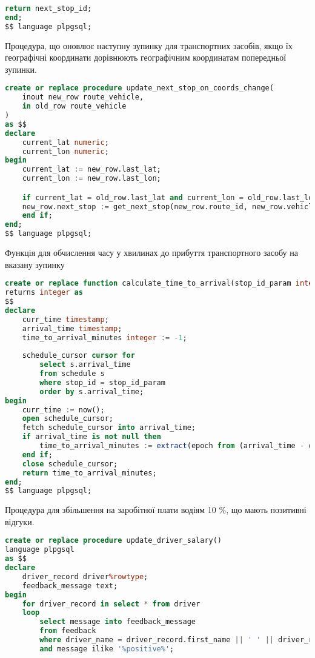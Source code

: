 \documentclass[14pt]{extreport}
\begin{document}
\begin{normalsize}
\begin{small}
\begin{lstlisting}[language=sql]
	return next_stop_id;
end;
$$ language plpgsql;
		\end{lstlisting}
	\end{small}
	
	Процедура, що оновлює наступну зупинку для транспортних засобів, якщо їх географічні координати дорівнюють географічним координатам попередньої зупинки.
	\begin{small}
		\begin{lstlisting}[language=sql]
create or replace procedure update_next_stop_on_coords_change(
	inout new_row route_vehicle,
	in old_row route_vehicle
)
as $$
declare
	current_lat numeric;
	current_lon numeric;
begin
	current_lat := new_row.last_lat;
	current_lon := new_row.last_lon;

	if current_lat = old_row.last_lat and current_lon = old_row.last_lon then
	new_row.next_stop := get_next_stop(new_row.route_id, new_row.vehicle_id);
	end if;
end;
$$ language plpgsql;
		\end{lstlisting}
	\end{small}
	
	Функція для обчислення часу у хвилинах до прибуття транспортного засобу на вказану зупинку
	\begin{small}
		\begin{lstlisting}[language=sql]
create or replace function calculate_time_to_arrival(stop_id_param integer)
returns integer as
$$
declare
	curr_time timestamp;
	arrival_time timestamp;
	time_to_arrival_minutes integer := -1;
	
	schedule_cursor cursor for
		select s.arrival_time
		from schedule s
		where stop_id = stop_id_param
		order by s.arrival_time;
begin
	curr_time := now();
	open schedule_cursor;
	fetch schedule_cursor into arrival_time;
	if arrival_time is not null then
		time_to_arrival_minutes := extract(epoch from (arrival_time - curr_time))/60;
	end if;
	close schedule_cursor;
	return time_to_arrival_minutes;
end;
$$ language plpgsql;
		\end{lstlisting}
	\end{small}
	
	Процедура для збільшення на заробітної плати водіям  10 \%, що мають позитивні відгуки.
	\begin{small}
		\begin{lstlisting}[language=sql]
create or replace procedure update_driver_salary()
language plpgsql
as $$
declare
	driver_record driver%rowtype;
	feedback_message text;
begin
	for driver_record in select * from driver
	loop
		select message into feedback_message
		from feedback
		where driver_name = driver_record.first_name || ' ' || driver_record.last_name
		and message ilike '%positive%';
		

\end{lstlisting}
\end{small}
\end{normalsize}
\end{document}
